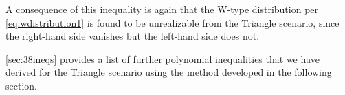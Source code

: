 A consequence of this inequality is again that the W-type distribution per \cref{eq:wdistribution1}
is found to be unrealizable from the Triangle scenario, since the right-hand side vanishes but the left-hand side does not.



\cref{sec:38ineqs} provides a list of further polynomial inequalities that we have derived for the Triangle scenario using the method developed in the following section.

